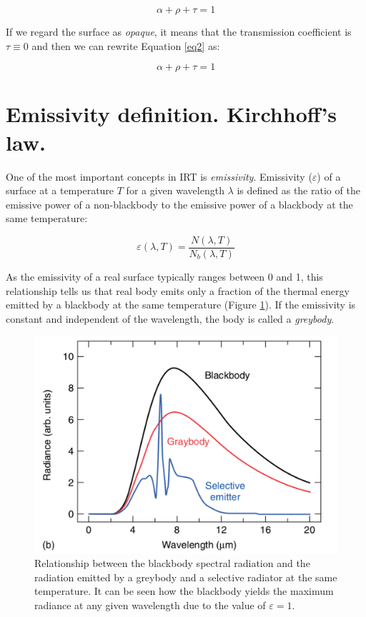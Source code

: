 		\begin{equation}
			\label{eq2}
			\alpha + \rho + \tau = 1
		\end{equation}
		
		If we regard the surface as \textit{opaque}, it means that the transmission coefficient is $\tau \equiv 0$ and then we can rewrite Equation \ref{eq2} as:	
		
		\begin{equation}
			\label{eq3}
			\alpha + \rho + \tau = 1
		\end{equation}
		
	\section{Emissivity definition. Kirchhoff's law.}
		
		One of the most important concepts in IRT is \textit{emissivity}. Emissivity ($\varepsilon$) of a surface at a temperature $T$ for a given wavelength $\lambda$ is defined as the ratio of the emissive power of a  non-blackbody to the emissive power of a blackbody at the same temperature:
		
		\begin{equation}
			\label{eq4}
			\varepsilon(\lambda,T)=\frac{N(\lambda,T)}{N_{b}(\lambda,T)}
		\end{equation}
		
		As the emissivity of a real surface typically ranges between 0 and 1, this relationship tells us that real body emits only a fraction of the thermal energy emitted by a blackbody at the same temperature (Figure \ref{fig4}). If the emissivity is constant and independent of the wavelength, the body is called a \textit{greybody}.
		
		\begin{figure}[ht!]
			\centering
			\captionsetup{justification=centering,margin=2cm}
			\includegraphics[scale=0.45]{Figures/Chapter01/BlackAndGreybodyComparison.pdf}
			\caption{\label{fig4} Relationship between the blackbody spectral radiation and the radiation emitted by a greybody and a selective radiator at the same temperature. It can be seen how the blackbody yields the maximum radiance at any given wavelength due to the value of $\varepsilon=1$.}
		\end{figure}
		
